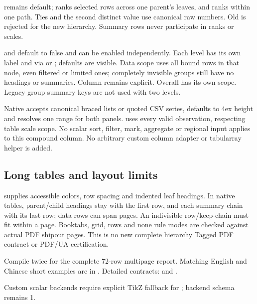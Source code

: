  remains default;  ranks selected rows across
one parent's leaves, and  ranks within one path. Ties and the second
distinct value use canonical raw numbers. Old  is rejected
for the new hierarchy. Summary rows never participate in ranks or scales.

 and  default to false and can be enabled
independently. Each level has its own label and  via
 or ; defaults are visible.
Data scope uses all bound rows in that node, even filtered or limited ones;
completely invisible groups still have no headings or summaries.
Column  remains explicit. Overall \key{\gradsummary} has its own
scope. Legacy group summary keys are not used with two levels.

Native  accepts canonical braced lists or quoted CSV
series, defaults to 4ex height and resolves one range for both panels.
 uses every valid observation, respecting table scale scope.
No scalar sort, filter, mark, aggregate or regional input applies to this compound
column. No arbitrary custom column adapter or tabularray helper is added.

\subsection{Long tables and layout limits}
 supplies accessible colors, row spacing and indented leaf
headings. In native  tables, parent/child headings stay with the
first row, and each summary chain with its last row; data rows can span pages.
An indivisible row/keep-chain must fit within a page. Booktabs, grid, rows and
none rule modes are checked against actual PDF shipout pages. This is no new
complete hierarchy Tagged PDF contract or PDF/UA certification.

Compile  twice for the complete
72-row multipage report. Matching English and Chinese short examples are in
. Detailed contracts: 
and .

Custom scalar backends require explicit TikZ fallback for ;
backend schema remains 1.
